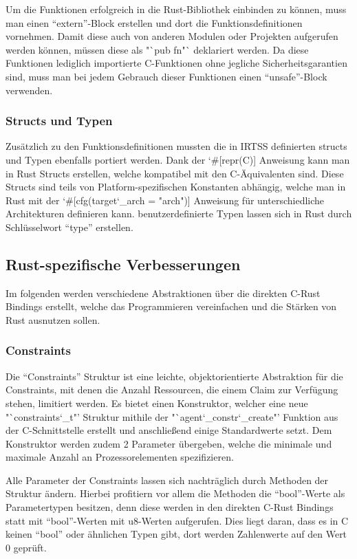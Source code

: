 Um die Funktionen erfolgreich in die Rust-Bibliothek einbinden zu können, muss man einen "`extern"'-Block erstellen und dort
die Funktionsdefinitionen vornehmen. Damit diese auch von anderen Modulen oder Projekten aufgerufen werden können, müssen diese
als "`pub fn"` deklariert werden. Da diese Funktionen lediglich importierte C-Funktionen ohne jegliche Sicherheitsgarantien
sind, muss man bei jedem Gebrauch dieser Funktionen einen "`unsafe"'-Block verwenden.

\subsubsection{Structs und Typen}

Zusätzlich zu den Funktionsdefinitionen mussten die in IRTSS definierten structs und Typen ebenfalls portiert werden.
Dank der \char`#[repr(C)] Anweisung kann man in Rust Structs erstellen, welche kompatibel mit den C-Äquivalenten sind.
Diese Structs sind teils von Platform-spezifischen Konstanten abhängig, welche man in Rust mit der
\char`#[cfg(target\char`_arch = "arch")] Anweisung für unterschiedliche Architekturen definieren kann.
benutzerdefinierte Typen lassen sich in Rust durch Schlüsselwort "`type"' erstellen.

\subsection{Rust-spezifische Verbesserungen}

Im folgenden werden verschiedene Abstraktionen über die direkten C-Rust Bindings erstellt, welche das Programmieren
vereinfachen und die Stärken von Rust ausnutzen sollen.

\subsubsection{Constraints}

Die "`Constraints"' Struktur ist eine leichte, objektorientierte Abstraktion für die Constraints, mit denen die Anzahl Ressourcen, die
einem Claim zur Verfügung stehen, limitiert werden.
Es bietet einen Konstruktor, welcher eine neue "`constraints\char`_t"' Struktur mithile der "`agent\char`_constr\char`_create"'
Funktion aus der C-Schnittstelle erstellt und anschließend einige Standardwerte setzt. Dem Konstruktor werden
zudem 2 Parameter übergeben, welche die minimale und maximale Anzahl an Prozessorelementen spezifizieren.

Alle Parameter der Constraints lassen sich nachträglich durch Methoden der Struktur ändern. Hierbei profitiern vor allem die Methoden
die "`bool"'-Werte als Parametertypen besitzen, denn diese werden in den direkten C-Rust Bindings statt mit "`bool"'-Werten mit
u8-Werten aufgerufen. Dies liegt daran, dass es in C keinen "`bool"' oder ähnlichen Typen gibt, dort werden Zahlenwerte auf den
Wert 0 geprüft.

